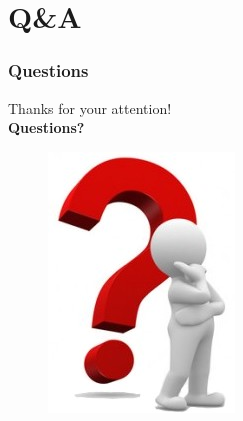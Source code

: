 \documentclass[10pt]{beamer}
\begin{document}


\section*{Q\&A}
\begin{frame}
  \frametitle{Questions}

  \begin{center}
    Thanks for your attention!\\
    \vspace{0.5cm}
    {\LARGE\textbf{Questions?}}
  \end{center}

  \begin{figure}[b!]
    \begin{center}
      \includegraphics[width=0.25\columnwidth]{./pictures/Questions.jpg}
    \end{center}  
  \end{figure}
\end{frame}



\end{document}
